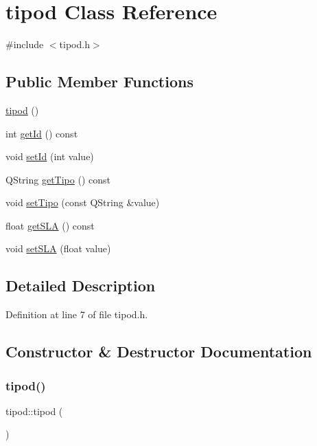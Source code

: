 \hypertarget{classtipod}{}\section{tipod Class Reference}
\label{classtipod}


{\ttfamily \#include $<$tipod.\+h$>$}

\subsection*{Public Member Functions}
\begin{DoxyCompactItemize}
\item 
\hyperlink{classtipod_aea0583170290bcfd453f00cd7e916b26}{tipod} ()
\item 
int \hyperlink{classtipod_a8f9426cbcef23976293ae0961b382907}{get\+Id} () const
\item 
void \hyperlink{classtipod_ae3f6b8df170353ef58a862b746d3d288}{set\+Id} (int value)
\item 
Q\+String \hyperlink{classtipod_ab84c5257439bcf916770d2facad689de}{get\+Tipo} () const
\item 
void \hyperlink{classtipod_a2430c9b9e742243038b3fdb43a7bd429}{set\+Tipo} (const Q\+String \&value)
\item 
float \hyperlink{classtipod_a19cb0132a802684607abe02c0c2b63f2}{get\+S\+LA} () const
\item 
void \hyperlink{classtipod_ad0da4edb16cb79061875519e94b768d7}{set\+S\+LA} (float value)
\end{DoxyCompactItemize}


\subsection{Detailed Description}


Definition at line 7 of file tipod.\+h.



\subsection{Constructor \& Destructor Documentation}
\hypertarget{classtipod_aea0583170290bcfd453f00cd7e916b26}{}\label{classtipod_aea0583170290bcfd453f00cd7e916b26} 
\subsubsection{\texorpdfstring{tipod()}{tipod()}}
{\footnotesize\ttfamily tipod\+::tipod (\begin{DoxyParamCaption}{ }\end{DoxyParamCaption})}



